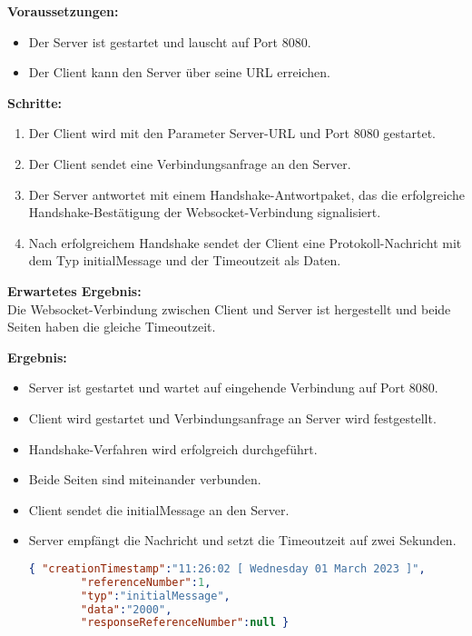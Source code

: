 \documentclass[thesis.tex]{subfiles}
\begin{document}
\textbf{Voraussetzungen:}
\begin{itemize}
    \item Der Server ist gestartet und lauscht auf Port 8080.
    \item Der Client kann den Server über seine URL erreichen.
\end{itemize}

\textbf{Schritte:}
\begin{enumerate}
    \item Der Client wird mit den Parameter Server-URL und Port 8080 gestartet.
    \item Der Client sendet eine Verbindungsanfrage an den Server.
    \item Der Server antwortet mit einem Handshake-Antwortpaket, das die erfolgreiche\\ Handshake-Bestätigung der Websocket-Verbindung signalisiert.
    \item Nach erfolgreichem Handshake sendet der Client eine Protokoll-Nachricht mit dem Typ \glqq initialMessage\grqq{} und der Timeoutzeit als Daten.
\end{enumerate}

\textbf{Erwartetes Ergebnis:}\\
Die Websocket-Verbindung zwischen Client und Server ist hergestellt und beide Seiten haben die gleiche Timeoutzeit.

\textbf{Ergebnis:}
\begin{itemize}
    \item Server ist gestartet und wartet auf eingehende Verbindung auf Port 8080.
    \item Client wird gestartet und Verbindungsanfrage an Server wird festgestellt.
    \item Handshake-Verfahren wird erfolgreich durchgeführt.
    \item Beide Seiten sind miteinander verbunden.
    \item Client sendet die \glqq initialMessage\grqq{} an den Server.
    \item Server empfängt die Nachricht und setzt die Timeoutzeit auf zwei Sekunden.
    \begin{lstlisting}[caption={[Beispiel einer Protokollnachricht vom Typ initialMessage]Beispiel einer Protokollnachricht vom Typ initialMessage \lbrack eigene Darstellung\rbrack},captionpos=b,language=json,firstnumber=1]
        { "creationTimestamp":"11:26:02 [ Wednesday 01 March 2023 ]",
        "referenceNumber":1,
        "typ":"initialMessage",
        "data":"2000",
        "responseReferenceNumber":null }
    \end{lstlisting}
\end{itemize}
\end{document}
